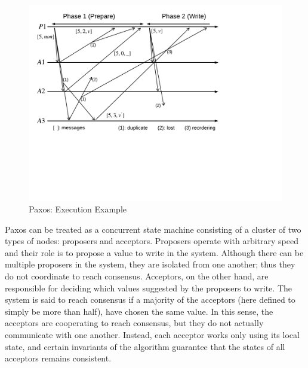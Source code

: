 \begin{figure}
\begin{center}
\includegraphics[scale=.34]{figs/paxos_example_nowitness}
\end{center}
\caption{Paxos: Execution Example}
\label{fig:paxos-example}
\end{figure}

Paxos can be treated as a concurrent state machine consisting of a cluster of two types of nodes: proposers and acceptors.
Proposers operate with arbitrary speed and their role is to propose a value to write in the system.
Although there can be multiple proposers in the system, they are isolated from one another;
thus they do not coordinate to reach consensus.
Acceptors, on the other hand, are responsible for deciding which values suggested by the proposers to write.
The system is said to reach consensus if a majority of the acceptors (here defined to simply be more than half), have chosen the same value.
In this sense, the acceptors are cooperating to reach consensus, but they do not actually communicate with one another.
Instead, each acceptor works only using its local state, and certain invariants of the algorithm guarantee that the states of all acceptors remains consistent.

